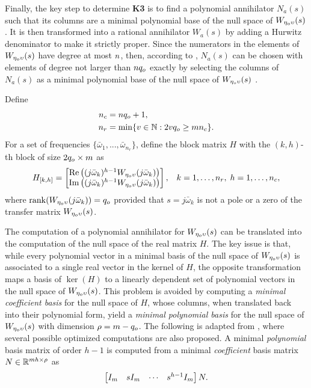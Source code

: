 Finally, the key step to determine \textbf{K3} is to find a polynomial annihilator $N_a(s)$ such that its columns are a minimal polynomial base of the null space of $W_{\eta_o\upsilon}(s)$. It is then transformed into a rational annihilator $W_a(s)$ by adding a Hurwitz denominator to make it strictly proper. Since the numerators in the elements of $W_{\eta_o\upsilon}(s)$ have degree at most $n$, then, according to \cite[Prop. 1]{zuniga_anaya_improved_2009}, $N_a(s)$ can be chosen with elements of degree not larger than $n{q_o}$ exactly by selecting the columns of $N_a(s)$ as a minimal polynomial base of the null space of $W_{\eta_o\upsilon}(s)$ \cite[Main Thm.]{forney_jr_minimal_1975}.

Define
\begin{subequations}
  \label{eq:ddall_ncnr}
  \begin{align}
    n_c &= n{q_o} + 1, \\
    n_r &= \min\{v\in\mathbb{N} : 2v{q_o} \geq m n_c\}.
  \end{align}
\end{subequations}
For a set of frequencies $\{\bar{\omega}_1, ..., \bar{\omega}_{n_r}\}$, define the block matrix $H$ with the $(k,h)$-th block of size $2{q_o}\times m$ as
\begin{align}
  \label{eq:ddall_H_hk}
  H_{[k,h]} &=
		\begin{bmatrix}
		\operatorname{Re}\left((j\bar{\omega}_k)^{h-1}W_{\eta_o\upsilon}(j\bar{\omega}_k)\right) \\
		\operatorname{Im}\left((j\bar{\omega}_k)^{h-1}W_{\eta_o\upsilon}(j\bar{\omega}_k)\right)
		\end{bmatrix}, & k=1,\dotsc,n_r, \; h=1,\dotsc,n_c,
\end{align}
where $\operatorname{rank}(W_{\eta_o\upsilon}(j\bar{\omega}_k)) = {q_o}$ provided that $s=j\bar{\omega}_k$ is not a pole or a zero of the transfer matrix $W_{\eta_o\upsilon}(s)$.

The computation of a polynomial annihilator for $W_{\eta_o\upsilon}(s)$ can be translated into the computation of the null space of the real matrix $H$. The key issue is that, while every polynomial vector in a minimal basis of the null space of $W_{\eta_o\upsilon}(s)$ is associated to a single real vector in the kernel of $H$, the opposite transformation maps a basis of $\ker(H)$ to a linearly dependent set of polynomial vectors in the null space of $W_{\eta_o\upsilon}(s)$. This problem is avoided by computing a \emph{minimal coefficient basis} for the null space of $H$, whose columns, when translated back into their polynomial form, yield a \emph{minimal polynomial basis} for the null space of $W_{\eta_o\upsilon}(s)$ with dimension $\rho=m-{q_o}$. The following  is adapted from \cite{zuniga_anaya_improved_2009}, where several possible optimized computations are also proposed. A minimal \emph{polynomial} basis matrix of order $h-1$ is computed from a minimal \emph{coefficient} basis matrix $N\in\mathbb{R}^{m h\times\rho}$ as
\begin{equation}
  \begin{bmatrix}I_m & s I_m & \cdots & s^{h-1}I_m\end{bmatrix}N.
\end{equation}


